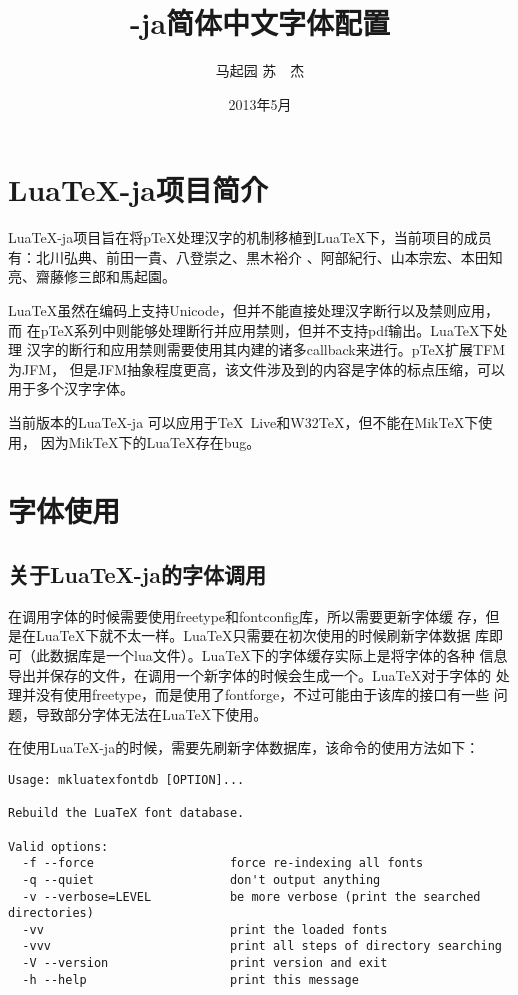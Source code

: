\documentclass[DIV=13]{article}
\title{\LuaTeX-ja简体中文字体配置}
\author{马起园 苏　杰}
\date{2013年5月}
\def\pTeX{p\TeX}
\def\LuaTeX{Lua\TeX}
\def\XeTeX{\hologo{XeTeX}}
\begin{document}
\maketitle
\section{\LuaTeX-ja项目简介}
\LuaTeX-ja项目旨在将\pTeX 处理汉字的机制移植到\LuaTeX 下，当前项目的成员
有：北川弘典、前田一貴、八登崇之、黒木裕介 、阿部紀行、山本宗宏、本田知
亮、齋藤修三郎和馬起園。

\LuaTeX 虽然在编码上支持Unicode，但并不能直接处理汉字断行以及禁则应用，而
在\pTeX 系列中则能够处理断行并应用禁则，但并不支持pdf输出。\LuaTeX 下处理
汉字的断行和应用禁则需要使用其内建的诸多callback来进行。\pTeX 扩展TFM为JFM，
但是JFM抽象程度更高，该文件涉及到的内容是字体的标点压缩，可以用于多个汉字字体。

当前版本的\LuaTeX-ja 可以应用于\TeX\ Live和W32\TeX，但不能在MikTeX下使用，
因为MikTeX下的\LuaTeX 存在bug。
\section{字体使用}
\subsection{关于Lua\TeX-ja的字体调用}
\XeTeX 在调用字体的时候需要使用freetype和fontconfig库，所以需要更新字体缓
存，但是在\LuaTeX 下就不太一样。\LuaTeX 只需要在初次使用的时候刷新字体数据
库即可（此数据库是一个lua文件）。\LuaTeX 下的字体缓存实际上是将字体的各种
信息导出并保存的文件，在调用一个新字体的时候会生成一个。\LuaTeX 对于字体的
处理并没有使用freetype，而是使用了fontforge，不过可能由于该库的接口有一些
问题，导致部分字体无法在\LuaTeX 下使用。

在使用\LuaTeX-ja的时候，需要先刷新字体数据库，该命令的使用方法如下：
\begin{verbatim}
Usage: mkluatexfontdb [OPTION]...
    
Rebuild the LuaTeX font database.

Valid options:
  -f --force                   force re-indexing all fonts
  -q --quiet                   don't output anything
  -v --verbose=LEVEL           be more verbose (print the searched directories)
  -vv                          print the loaded fonts
  -vvv                         print all steps of directory searching
  -V --version                 print version and exit
  -h --help                    print this message
\end{verbatim}
\end{document}
